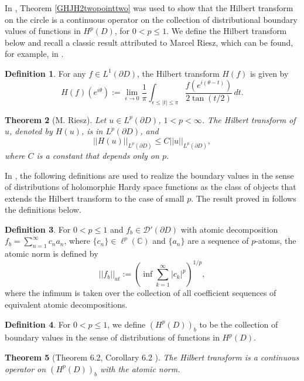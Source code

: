 \documentclass[suppldata]{interact}
\theoremstyle{plain}%
\newtheorem{theorem}{Theorem}[section]
\theoremstyle{definition}
\newtheorem{deff}[theorem]{Definition}
\theoremstyle{remark}
\newcommand{\C}{\mathbb C}
\newcommand{\p}{\partial}
\begin{document}
In \cite{GHJH2}, Theorem \ref{GHJH2twopointtwo} was used to show that the Hilbert transform on the circle is a continuous operator on the collection of distributional boundary values of functions in $H^p(D)$, for $0 < p \leq 1$. We define the Hilbert transform below and recall a classic result attributed to Marcel Riesz, which can be found, for example, in \cite{Rep}. 

\begin{deff}
        For any $f \in L^1(\p D)$, the Hilbert transform $H(f)$ is given by 
        \[
            H(f)(e^{i\theta}) := \lim_{\epsilon \to 0}\frac{1}{\pi} \int_{\epsilon \leq |t| \leq \pi} \frac{f(e^{i(\theta-t)})}{2\tan(t/2)}\,dt.
        \]
\end{deff}

\begin{theorem}[M. Riesz]\label{hilbertpgreaterthanone}
Let $u \in L^p(\p D)$, $1 < p < \infty$. The Hilbert transform of $u$, denoted by $H(u)$, is in $L^p(\p D)$, and 
\[
        ||H(u)||_{L^p(\p D)}\leq C ||u||_{L^p(\p D)},
\]
where $C$ is a constant that depends only on $p$.
\end{theorem}

In \cite{GHJH2}, the following definitions are used to realize the boundary values in the sense of distributions of holomorphic Hardy space functions as the class of objects that extends the Hilbert transform to the case of small $p$. The result proved in \cite{GHJH2} follows the definitions below.

\begin{deff}\label{atomicnorm}
    For $0< p \leq 1$ and $f_b \in \mathcal{D}'(\p D)$ with atomic decomposition $f_b = \sum_{n=1}^\infty c_n a_n$, where $\{c_n\} \in \ell^p(\C)$ and $\{a_n\}$ are a sequence of $p$-atoms, the atomic norm is defined by
    \[
        ||f_b||_{at} := \left( \inf \sum_{k=1}^\infty |c_k|^p\right)^{1/p},
    \]
    where the infimum is taken over the collection of all coefficient sequences of equivalent atomic decompositions. 
\end{deff}

\begin{deff}
    For $0 < p \leq 1$, we define $(H^p(D))_b$ to be the collection of boundary values in the sense of distributions of functions in $H^p(D)$.
\end{deff}

\begin{theorem}[Theorem 6.2, Corollary 6.2 \cite{GHJH2}]\label{hilbertholohardy}
The Hilbert transform is a continuous operator on $(H^p(D))_b$ with the atomic norm. 
\end{theorem}
\end{document}
